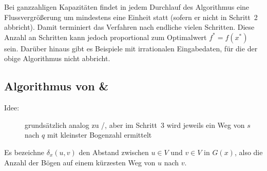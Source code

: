 Bei ganzzahligen Kapazitäten findet in jedem Durchlauf des Algorithmus eine Flussvergrößerung um mindestens eine Einheit statt (sofern er nicht in Schritt~2 abbricht). Damit terminiert das Verfahren nach endliche vielen Schritten. Diese Anzahl an Schritten kann jedoch proportional zum Optimalwert $f^\ast = f(x^\ast)$ sein.
Darüber hinaus gibt es Beispiele mit irrationalen Eingabedaten, für die der obige Algorithmus nicht abbricht.

\subsection{Algorithmus von  \& }

\begin{description}
	\item[Idee:] grundsätzlich analog zu /, aber im Schritt~3 wird jeweils ein Weg von $s$ nach $q$ mit kleinster Bogenzahl ermittelt
\end{description}

Es bezeichne $\delta_x(u,v)$ den Abstand zwischen $u \in V$ und $v \in V$ in $G(x)$, also die Anzahl der Bögen auf einem kürzesten Weg von $u$ nach $v$.


